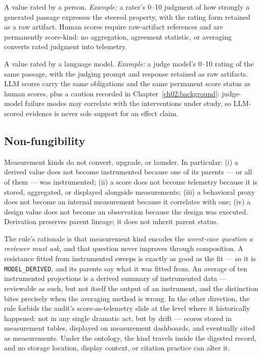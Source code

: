 \begin{definition}\label{ch03:mk:human}
A value rated by a person. \emph{Example:} a rater's 0--10 judgment of how strongly a generated passage expresses the steered property, with the rating form retained as a raw artifact. Human scores require raw-artifact references and are permanently score-kind: no aggregation, agreement statistic, or averaging converts rated judgment into telemetry.
\end{definition}

\begin{definition}\label{ch03:mk:llm}
A value rated by a language model. \emph{Example:} a judge model's 0--10 rating of the same passage, with the judging prompt and response retained as raw artifacts. LLM scores carry the same obligations and the same permanent score status as human scores, plus a caution recorded in Chapter~\ref{ch02:background}: judge-model failure modes may correlate with the interventions under study, so LLM-scored evidence is never sole support for an effect claim.
\end{definition}

\subsection{Non-fungibility}\label{ch03:measurement:nonfungible}

\begin{ruleenv}\label{ch03:rule:nonfungible}
Measurement kinds do not convert, upgrade, or launder. In particular: (i) a derived value does not become instrumented because one of its parents --- or all of them --- was instrumented; (ii) a score does not become telemetry because it is stored, aggregated, or displayed alongside measurements; (iii) a behavioral proxy does not become an internal measurement because it correlates with one; (iv) a design value does not become an observation because the design was executed. Derivation preserves parent lineage; it does not inherit parent status.
\end{ruleenv}

The rule's rationale is that measurement kind encodes the \emph{worst-case question a reviewer must ask}, and that question never improves through composition. A resistance fitted from instrumented sweeps is exactly as good as the fit --- so it is \texttt{MODEL\_DERIVED}, and its parents say what it was fitted from. An average of ten instrumented projections is a derived summary of instrumented data --- reviewable as such, but not itself the output of an instrument, and the distinction bites precisely when the averaging method is wrong. In the other direction, the rule forbids the audit's score-as-telemetry slide at the level where it historically happened: not in any single dramatic act, but by drift --- scores stored in measurement tables, displayed on measurement dashboards, and eventually cited as measurements. Under the ontology, the kind travels inside the digested record, and no storage location, display context, or citation practice can alter it.

